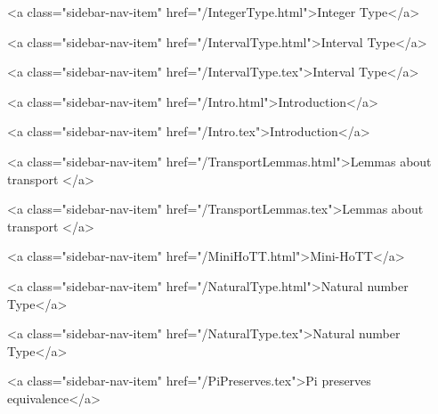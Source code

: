           <a class="sidebar-nav-item" href="/IntegerType.html">Integer Type</a>
        
      
    
      
        
          <a class="sidebar-nav-item" href="/IntervalType.html">Interval Type</a>
        
      
    
      
        
          <a class="sidebar-nav-item" href="/IntervalType.tex">Interval Type</a>
        
      
    
      
        
          <a class="sidebar-nav-item" href="/Intro.html">Introduction</a>
        
      
    
      
        
          <a class="sidebar-nav-item" href="/Intro.tex">Introduction</a>
        
      
    
      
        
          <a class="sidebar-nav-item" href="/TransportLemmas.html">Lemmas about transport </a>
        
      
    
      
        
          <a class="sidebar-nav-item" href="/TransportLemmas.tex">Lemmas about transport </a>
        
      
    
      
        
          <a class="sidebar-nav-item" href="/MiniHoTT.html">Mini-HoTT</a>
        
      
    
      
        
          <a class="sidebar-nav-item" href="/NaturalType.html">Natural number Type</a>
        
      
    
      
        
          <a class="sidebar-nav-item" href="/NaturalType.tex">Natural number Type</a>
        
      
    
      
        
          <a class="sidebar-nav-item" href="/PiPreserves.tex">Pi preserves equivalence</a>
        
      
    
      
        
